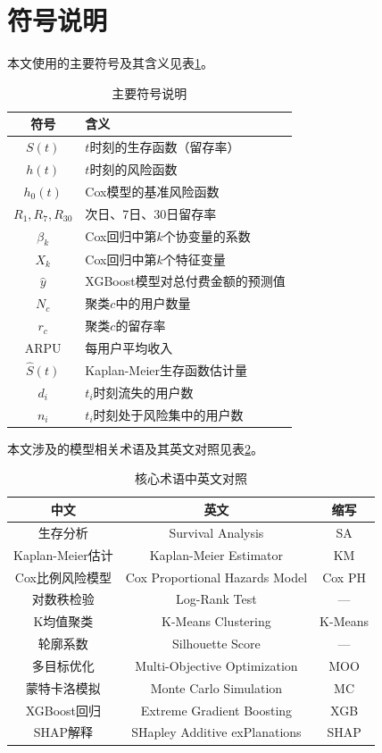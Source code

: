 \section{符号说明}

本文使用的主要符号及其含义见表\ref{tab:notation}。

\begin{table}[H]
\centering
\caption{主要符号说明}
\label{tab:notation}
\begin{tabular}{c|l}
\toprule
\textbf{符号} & \textbf{含义} \\
\midrule
$S(t)$         & $t$时刻的生存函数（留存率） \\
$h(t)$         & $t$时刻的风险函数 \\
$h_0(t)$       & Cox模型的基准风险函数 \\
$R_1, R_7, R_{30}$ & 次日、7日、30日留存率 \\
$\beta_k$       & Cox回归中第$k$个协变量的系数 \\
$X_k$           & Cox回归中第$k$个特征变量 \\
$\hat{y}$       & XGBoost模型对总付费金额的预测值 \\
$N_c$           & 聚类$c$中的用户数量 \\
$r_c$           & 聚类$c$的留存率 \\
$\text{ARPU}$   & 每用户平均收入 \\
$\hat{S}(t)$    & Kaplan-Meier生存函数估计量 \\
$d_i$           & $t_i$时刻流失的用户数 \\
$n_i$           & $t_i$时刻处于风险集中的用户数 \\
\bottomrule
\end{tabular}
\end{table}

本文涉及的模型相关术语及其英文对照见表\ref{tab:terms}。

\begin{table}[H]
\centering
\caption{核心术语中英文对照}
\label{tab:terms}
\begin{tabular}{c|c|c}
\toprule
\textbf{中文} & \textbf{英文} & \textbf{缩写} \\
\midrule
生存分析 & Survival Analysis & SA \\
Kaplan-Meier估计 & Kaplan-Meier Estimator & KM \\
Cox比例风险模型 & Cox Proportional Hazards Model & Cox PH \\
对数秩检验 & Log-Rank Test & --- \\
K均值聚类 & K-Means Clustering & K-Means \\
轮廓系数 & Silhouette Score & --- \\
多目标优化 & Multi-Objective Optimization & MOO \\
蒙特卡洛模拟 & Monte Carlo Simulation & MC \\
XGBoost回归 & Extreme Gradient Boosting & XGB \\
SHAP解释 & SHapley Additive exPlanations & SHAP \\
\bottomrule
\end{tabular}
\end{table}
